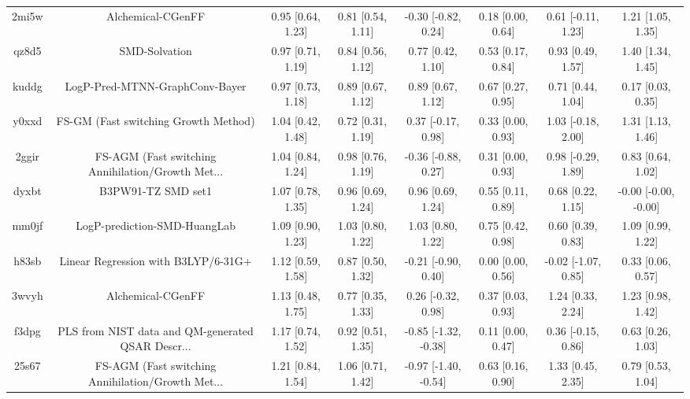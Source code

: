 \documentclass{article}
\begin{document}
\begin{center}
\begin{longtable}{|cccccccc|}
 2mi5w &                                  Alchemical-CGenFF &  0.95 [0.64, 1.23] &  0.81 [0.54, 1.11] &   -0.30 [-0.82, 0.24] &  0.18 [0.00, 0.64] &   0.61 [-0.11, 1.23] &     1.21 [1.05, 1.35] \\
 qz8d5 &                                      SMD-Solvation &  0.97 [0.71, 1.19] &  0.84 [0.56, 1.12] &     0.77 [0.42, 1.10] &  0.53 [0.17, 0.84] &    0.93 [0.49, 1.57] &     1.40 [1.34, 1.45] \\
 kuddg &                     LogP-Pred-MTNN-GraphConv-Bayer &  0.97 [0.73, 1.18] &  0.89 [0.67, 1.12] &     0.89 [0.67, 1.12] &  0.67 [0.27, 0.95] &    0.71 [0.44, 1.04] &     0.17 [0.03, 0.35] \\
 y0xxd &               FS-GM (Fast switching Growth Method) &  1.04 [0.42, 1.48] &  0.72 [0.31, 1.19] &    0.37 [-0.17, 0.98] &  0.33 [0.00, 0.93] &   1.03 [-0.18, 2.00] &     1.31 [1.13, 1.46] \\
 2ggir &  FS-AGM (Fast switching Annihilation/Growth Met... &  1.04 [0.84, 1.24] &  0.98 [0.76, 1.19] &   -0.36 [-0.88, 0.27] &  0.31 [0.00, 0.93] &   0.98 [-0.29, 1.89] &     0.83 [0.64, 1.02] \\
 dyxbt &                                 B3PW91-TZ SMD set1 &  1.07 [0.78, 1.35] &  0.96 [0.69, 1.24] &     0.96 [0.69, 1.24] &  0.55 [0.11, 0.89] &    0.68 [0.22, 1.15] &  -0.00 [-0.00, -0.00] \\
 mm0jf &                       LogP-prediction-SMD-HuangLab &  1.09 [0.90, 1.23] &  1.03 [0.80, 1.22] &     1.03 [0.80, 1.22] &  0.75 [0.42, 0.98] &    0.60 [0.39, 0.83] &     1.09 [0.99, 1.22] \\
 h83sb &                Linear Regression with B3LYP/6-31G+ &  1.12 [0.59, 1.58] &  0.87 [0.50, 1.32] &   -0.21 [-0.90, 0.40] &  0.00 [0.00, 0.56] &  -0.02 [-1.07, 0.85] &     0.33 [0.06, 0.57] \\
 3wvyh &                                  Alchemical-CGenFF &  1.13 [0.48, 1.75] &  0.77 [0.35, 1.33] &    0.26 [-0.32, 0.98] &  0.37 [0.03, 0.93] &    1.24 [0.33, 2.24] &     1.23 [0.98, 1.42] \\
 f3dpg &  PLS from NIST data and QM-generated QSAR Descr... &  1.17 [0.74, 1.52] &  0.92 [0.51, 1.35] &  -0.85 [-1.32, -0.38] &  0.11 [0.00, 0.47] &   0.36 [-0.15, 0.86] &     0.63 [0.26, 1.03] \\
 25s67 &  FS-AGM (Fast switching Annihilation/Growth Met... &  1.21 [0.84, 1.54] &  1.06 [0.71, 1.42] &  -0.97 [-1.40, -0.54] &  0.63 [0.16, 0.90] &    1.33 [0.45, 2.35] &     0.79 [0.53, 1.04] \\

\end{longtable}
\end{center}
\end{document}
